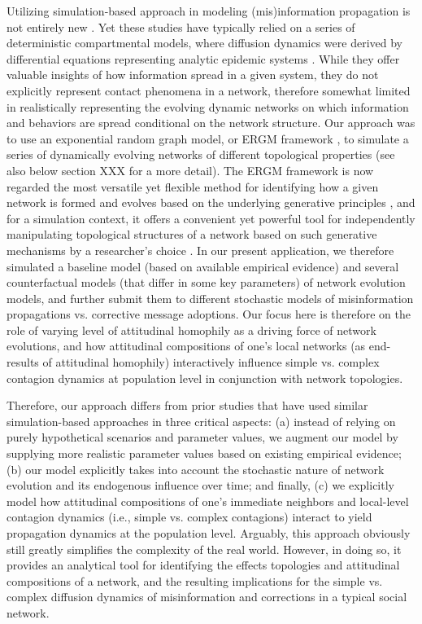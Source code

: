 \documentclass[man, 12pt, a4paper, noextraspace]{apa6}
\begin{document}
    Utilizing simulation-based approach in modeling (mis)information propagation is not entirely new \parencite[e.g.,][]{tambuscio2015fact, jin2013epidemiological, acemoglu2010spread, zhao2010weak}. Yet these studies have typically relied on a series of deterministic compartmental models, where diffusion dynamics were derived by differential equations representing analytic epidemic systems \parencite[e.g., see][]{zhao2010weak}. While they offer valuable insights of how information spread in a given system, they do not explicitly represent contact phenomena in a network, therefore somewhat limited in realistically representing the evolving dynamic networks on which information and behaviors are spread conditional on the network structure. Our approach was to use an exponential random graph model, or ERGM framework \parencite{robins2007introduction, morris2008specification}, to simulate a series of dynamically evolving networks of different topological properties (see also below section XXX for a more detail). The ERGM framework is now regarded the most versatile yet flexible method for identifying how a given network is formed and evolves based on the underlying generative principles \parencite{cranmer2017navigating, robins2007introduction}, and for a simulation context, it offers a convenient yet powerful tool for independently manipulating topological structures of a network based on such generative mechanisms by a researcher's choice \parencite{morris2008specification, leifeld2017temporal}. In our present application, we therefore simulated a baseline model (based on available empirical evidence) and several counterfactual models (that differ in some key parameters) of network evolution models, and further submit them to different stochastic models of misinformation propagations vs. corrective message adoptions. Our focus here is therefore on the role of varying level of attitudinal homophily as a driving force of network evolutions, and how attitudinal compositions of one's local networks (as end-results of attitudinal homophily) interactively influence simple vs. complex contagion dynamics at population level in conjunction with network topologies.
    
    Therefore, our approach differs from prior studies that have used similar simulation-based approaches in three critical aspects: (a) instead of relying on purely hypothetical scenarios and parameter values, we augment our model by supplying more realistic parameter values based on existing empirical evidence; (b) our model explicitly takes into account the stochastic nature of network evolution and its endogenous influence over time; and finally, (c) we explicitly model how attitudinal compositions of one's immediate neighbors and local-level contagion dynamics (i.e., simple vs. complex contagions) interact to yield propagation dynamics at the population level. Arguably, this approach obviously still greatly simplifies the complexity of the real world. However, in doing so, it provides an analytical tool for identifying the effects topologies and attitudinal compositions of a network, and the resulting implications for the simple vs. complex diffusion dynamics of misinformation and corrections in a typical social network.
\end{document}
